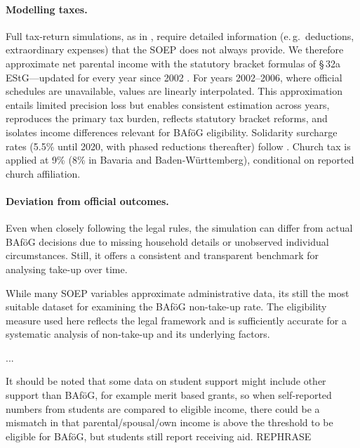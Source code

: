 \paragraph{Modelling taxes.}
Full tax‑return simulations, as in \cite{herber_non-take-up_2019}, require detailed information (e.\,g.\ deductions, extraordinary expenses) that the SOEP does not always provide.  
We therefore approximate net parental income with the statutory bracket formulas of §\,32a EStG—updated for every year since 2002 \citep{estg_law,estg_2025,estg_2024,estg_2023,estg_2022,estg_2021,estg_2020,estg_2019,estg_2018,estg_2017,estg_2016,estg_2015,estg_2014,estg_2013,estg_2012,estg_2007,estg_2006,estg_lohninfo_2012}.  
For years 2002–2006, where official schedules are unavailable, values are linearly interpolated.  
This approximation entails limited precision loss but enables consistent estimation across years, reproduces the primary tax burden, reflects statutory bracket reforms, and isolates income differences relevant for BAföG eligibility.  
Solidarity surcharge rates (5.5\% until 2020, with phased reductions thereafter) follow \citet{solzg_2018,solzg_2019,solzg_2023}.  
Church tax is applied at 9\% (8\% in Bavaria and Baden-Württemberg), conditional on reported church affiliation.

\paragraph{Deviation from official outcomes.}
Even when closely following the legal rules, the simulation can differ from actual BAföG decisions due to missing household details or unobserved individual circumstances. Still, it offers a consistent and transparent benchmark for analysing take-up over time.

While many SOEP variables approximate administrative data, its still the most suitable dataset for examining the BAföG non-take-up rate. 
The eligibility measure used here reflects the legal framework and is sufficiently accurate for a systematic analysis of non-take-up and its underlying factors.

...

It should be noted that some data on student support might include other support than BAföG, for example merit based grants, so when self-reported numbers from students are compared to eligible income, there could be a mismatch in that parental/spousal/own income is above the threshold to be eligible for BAföG, but students still report receiving aid. REPHRASE